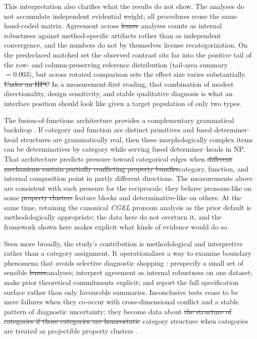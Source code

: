 \documentclass[12pt]{article}
\providecommand{\DIFaddtex}[1]{{\protect\color{DIFgreen}#1}} %
\providecommand{\DIFdeltex}[1]{{\protect\color{red}\sout{#1}}}                      %
\providecommand{\DIFaddbegin}{} %
\providecommand{\DIFaddend}{} %
\providecommand{\DIFdelbegin}{} %
\providecommand{\DIFdelend}{} %
\providecommand{\DIFadd}[1]{\texorpdfstring{\DIFaddtex{#1}}{#1}} %
\providecommand{\DIFdel}[1]{\texorpdfstring{\DIFdeltex{#1}}{}} %
\newcommand{\DIFscaledelfig}{0.5}
\newlength{\DIFdelgraphicswidth} %
\newlength{\DIFdelgraphicsheight} %
\newcommand{\DIFaddincludegraphics}[2][]{{\color{DIFgreen}\fbox{\DIFOincludegraphics[#1]{#2}}}} %
\newcommand{\DIFdelincludegraphics}[2][]{%
\sbox{\DIFdelgraphicsbox}{\DIFOincludegraphics[#1]{#2}}%
\settoboxwidth{\DIFdelgraphicswidth}{\DIFdelgraphicsbox} %
\settoboxtotalheight{\DIFdelgraphicsheight}{\DIFdelgraphicsbox} %
\scalebox{\DIFscaledelfig}{%
\parbox[b]{\DIFdelgraphicswidth}{\usebox{\DIFdelgraphicsbox}\\[-\baselineskip] \rule{\DIFdelgraphicswidth}{0em}}\llap{\resizebox{\DIFdelgraphicswidth}{\DIFdelgraphicsheight}{%
\setlength{\unitlength}{\DIFdelgraphicswidth}%
\begin{picture}(1,1)%
\thicklines\linethickness{2pt} %
{\color[rgb]{1,0,0}\put(0,0){\framebox(1,1){}}}%
{\color[rgb]{1,0,0}\put(0,0){\line( 1,1){1}}}%
{\color[rgb]{1,0,0}\put(0,1){\line(1,-1){1}}}%
\end{picture}%
}\hspace*{3pt}}} %
} %
\DeclareRobustCommand{\DIFaddbegin}{\DIFOaddbegin \let\includegraphics\DIFaddincludegraphics} %
\DeclareRobustCommand{\DIFaddend}{\DIFOaddend \let\includegraphics\DIFOincludegraphics} %
\DeclareRobustCommand{\DIFdelbegin}{\DIFOdelbegin \let\includegraphics\DIFdelincludegraphics} %
\DeclareRobustCommand{\DIFdelend}{\DIFOaddend \let\includegraphics\DIFOincludegraphics} %
\begin{document}
This interpretation also clarifies what the results do not show. The analyses do not accumulate independent evidential weight; all procedures reuse the same hand-coded matrix. Agreement across \DIFdelbegin \DIFdel{lenses }\DIFdelend \DIFaddbegin \DIFadd{analyses }\DIFaddend counts as internal robustness against method-specific artifacts rather than as independent convergence, and the numbers do not by themselves license recategorization. On the predeclared matched set the observed contrast sits far into the positive tail of the row- and column-preserving reference distribution (tail-area summary \(= 0.003\)), but across rotated comparison sets the effect size varies substantially. \DIFdelbegin \DIFdel{Under an HPC }\DIFdelend \DIFaddbegin \DIFadd{In a measurement-first }\DIFaddend reading, that combination of modest directionality, design sensitivity, and stable qualitative diagnosis is what an interface position should look like given a target population of only two types.

The fusion-of-functions architecture provides a complementary grammatical backdrop \parencite{Payne2007}. If category and function are distinct primitives and fused determiner--head structures are grammatically real, then these morphologically complex items can be determinatives by category while serving fused determiner--heads in NP. That architecture predicts pressure toward categorical edges when \DIFdelbegin \DIFdel{different mechanisms sustain partially conflicting property bundles}\DIFdelend \DIFaddbegin \DIFadd{category, function, and internal composition point in partly different directions}\DIFaddend . The measurements above are consistent with such pressure for the reciprocals: they behave pronoun-like on some \DIFdelbegin \DIFdel{property clusters }\DIFdelend \DIFaddbegin \DIFadd{feature blocks }\DIFaddend and determinative-like on others. At the same time, retaining the canonical \textit{CGEL} pronoun analysis as the prior default is methodologically appropriate; the data here do not overturn it, and the framework shown here makes explicit what kinds of evidence would do so.

Seen more broadly, the study's contribution is methodological and interpretive rather than a category assignment. It operationalizes a way to examine boundary phenomena that avoids selective diagnostic shopping \parencite{croft2001radical}: prespecify a small set of sensible \DIFdelbegin \DIFdel{lenses}\DIFdelend \DIFaddbegin \DIFadd{analyses}\DIFaddend ; interpret agreement as internal robustness on one dataset; make prior theoretical commitments explicit; and report the full specification surface rather than only favourable summaries. Inconclusive tests cease to be mere failures when they co-occur with cross-dimensional conflict and a stable pattern of diagnostic uncertainty; they become data about \DIFdelbegin \DIFdel{the structure of categories if those categories are homeostatic }\DIFdelend \DIFaddbegin \DIFadd{category structure when categories are treated as projectible property }\DIFaddend clusters \parencite{miller2021}.
\end{document}
